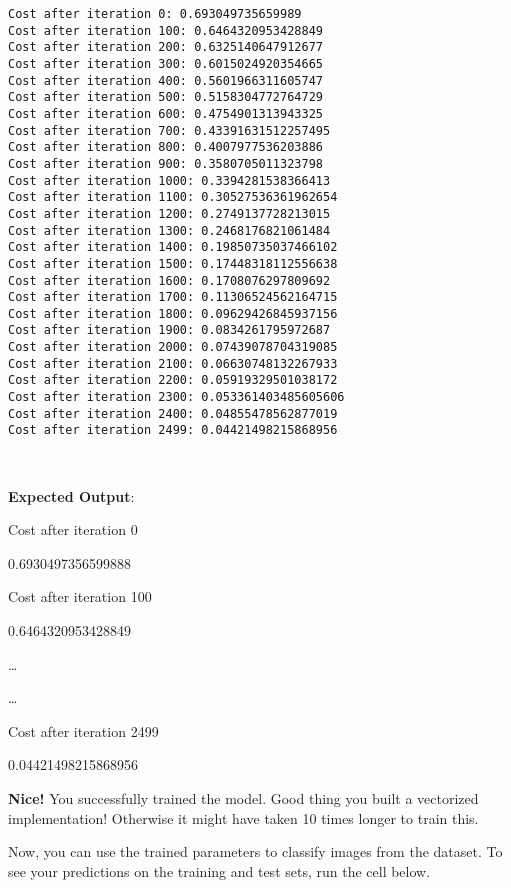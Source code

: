\documentclass[11pt]{article}
\begin{document}
    \begin{Verbatim}[commandchars=\\\{\}]
Cost after iteration 0: 0.693049735659989
Cost after iteration 100: 0.6464320953428849
Cost after iteration 200: 0.6325140647912677
Cost after iteration 300: 0.6015024920354665
Cost after iteration 400: 0.5601966311605747
Cost after iteration 500: 0.5158304772764729
Cost after iteration 600: 0.4754901313943325
Cost after iteration 700: 0.43391631512257495
Cost after iteration 800: 0.4007977536203886
Cost after iteration 900: 0.3580705011323798
Cost after iteration 1000: 0.3394281538366413
Cost after iteration 1100: 0.30527536361962654
Cost after iteration 1200: 0.2749137728213015
Cost after iteration 1300: 0.2468176821061484
Cost after iteration 1400: 0.19850735037466102
Cost after iteration 1500: 0.17448318112556638
Cost after iteration 1600: 0.1708076297809692
Cost after iteration 1700: 0.11306524562164715
Cost after iteration 1800: 0.09629426845937156
Cost after iteration 1900: 0.0834261795972687
Cost after iteration 2000: 0.07439078704319085
Cost after iteration 2100: 0.06630748132267933
Cost after iteration 2200: 0.05919329501038172
Cost after iteration 2300: 0.053361403485605606
Cost after iteration 2400: 0.04855478562877019
Cost after iteration 2499: 0.04421498215868956
    \end{Verbatim}

    \begin{center}
    \end{center}
    { \hspace*{\fill} \\}
    
    \textbf{Expected Output}:

Cost after iteration 0

0.6930497356599888

Cost after iteration 100

0.6464320953428849

\ldots{}

\ldots{}

Cost after iteration 2499

0.04421498215868956

    \textbf{Nice!} You successfully trained the model. Good thing you built
a vectorized implementation! Otherwise it might have taken 10 times
longer to train this.

Now, you can use the trained parameters to classify images from the
dataset. To see your predictions on the training and test sets, run the
cell below.
\end{document}
